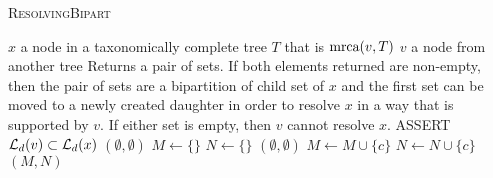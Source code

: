 \documentclass[11pt]{article}
\begin{document}
\begin{algorithm} \caption{\textsc{ResolvingBipart}}\label{AlgResolvingBipart}
\begin{algorithmic}
\REQUIRE $x$ a node in a taxonomically complete tree $T$ that is $\mbox{mrca}(v, T)$
\REQUIRE $v$ a node from another tree
\ENSURE Returns a pair of sets. If both elements returned are non-empty, then 
    the pair of sets are a  bipartition of child set of $x$ and the first set 
    can be moved to a newly created daughter in order to resolve $x$ in 
    a way that is supported by $v$.
    If either set is empty, then  $v$ cannot resolve $x$.
\STATE ASSERT $\mathcal{L}_d(v) \subset \mathcal{L}_d(x)$
    \RETURN $(\emptyset, \emptyset)$ 
\ENDIF
\STATE $M\leftarrow \{\}$
\STATE $N\leftarrow \{\}$
            \RETURN $(\emptyset, \emptyset)$ 
        \ENDIF
        $M\leftarrow M \cup \{ c\}$
    \ELSE
        $N\leftarrow N \cup \{ c\}$
    \ENDIF
\ENDFOR \\
\RETURN $(M, N)$
\end{algorithmic}
\end{algorithm}
\end{document}
